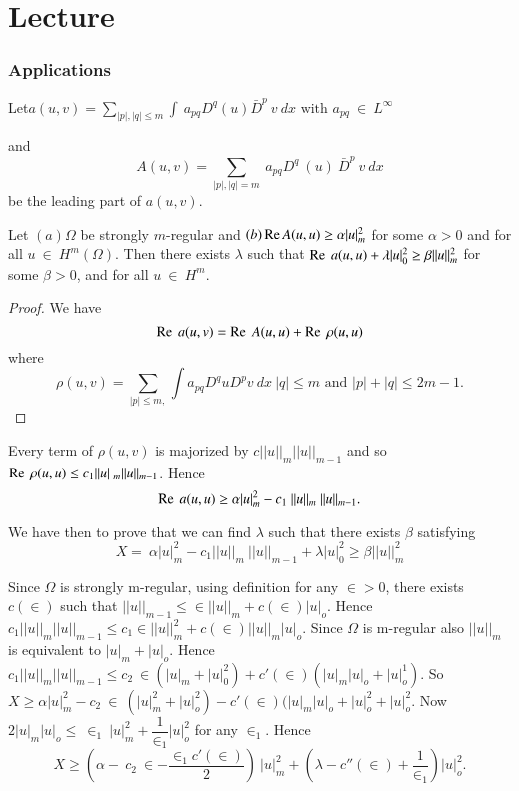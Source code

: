 
\chapter{Lecture}\label{lec13}%
\setcounter{section}{7}

\subsection{Applications}\label{lec13:sec7:subsec4}

Let\pageoriginale $ a(u,v) = \sum_{|p|,|q| \le m} \int~ a_{pq} D^q (u)\bar{D}^p ~ v
~ dx \text{ with }  a_{pq} ~ \in ~ L^\infty$ 

and 
$$
A(u,v) = \sum_{|p|,|q| = m } ~ a_{pq} D^{q} ~ (u) ~ \bar{D}^p ~ v ~ dx
$$
be the leading part of $a(u,v)$.

\setcounter{theorem}{7}
\begin{theorem}\label{lec13:sec7:subsec4:thm7.8}%
  Let $(a) \Omega$ be strongly $m$-regular and $(b) \operatorname{Re}  A(u,u) \ge
  \alpha | u |^2_m$ for some $\alpha > 0$ and for all $u ~ \in
  ~ H^m(\Omega)$. Then there exists $\lambda$ such that $\operatorname{Re}  ~ a(u,u) +
  \lambda | u |^2_0 \ge \beta || u ||^2_m$ for some $\beta > 0$, and for
  all $u ~ \in ~ H^m$. 
\end{theorem}

\begin{proof}%
  We have 
  $$
  \operatorname{Re}  ~ a(u,v) = \operatorname{Re}  ~ A(u,u) + \operatorname{Re}  ~ \rho (u,u)
  $$ 
  where 
  $$
  \rho (u,v) = \sum_{|p|\le m,} \int a_{pq} D^q u D^p v ~ dx ~ |q| \le m
  \text{ and } |p| + |q| \le 2m - 1. 
  $$
\end{proof}

Every term of $\rho (u,v)$ is majorized by $c || u ||_m || u ||_{m-1}$
and so $\operatorname{Re}  ~ \rho (u,u) \le c_1 || u |~_m || u ||_{m-1}$. Hence 
$$
\operatorname{Re}  ~ a(u,u) \ge \alpha | u |^2_m - c_1 ~ || u ||_m ~ ||u ||_{m-1}.
$$

We have then to prove that we can find $\lambda$ such that there
exists $\beta$ satisfying  
\begin{equation}
X = ~ \alpha | u |^2_m - c_1 || u ||_m ~ || u ||_{m-1} + \lambda | u
|^2_0 \ge \beta || u ||^2_m \tag{1}\label{lec13:sec7:subsec4:eq1} 
\end{equation}

Since $\Omega$ is strongly m-regular, using definition for any
$\in > 0$, there exists $c(\in)$ such that $|| u
||_{m-1}  \le \in || u ||_m + c(\in) | u |_o$. Hence\pageoriginale
$c_1 || u ||_m ||u ||_{m-1} \le c_1 \in || u ||^2_m +
c(\in) || u ||_m | u |_o$. Since $\Omega$ is m-regular also
$|| u ||_m$ is equivalent to $| u |_m + | u |_o$. Hence $c_1 || u ||_m
|| u ||_{m-1} \le c_2 ~ \in (| u |_m + | u |^2_0) +
c'(\in)(|u|_m|u|_o + |u |^1_o)$. So $X \ge \alpha | u |^2_m -
c_2 ~ \in ~ (|u|^2_m + | u |^2_o) - c'(\in) (|u|_m
|u|_o + |u|^2_o + |u|^2_o$. Now $2| u |_m| u |_o \le ~ \in_1 ~
| u |^2_m + \dfrac{1}{\in_1} | u |^2_o$ for any
$\in_1$. Hence 
$$
X \ge \left(\alpha - ~c_2 ~ \in - \dfrac{\in_1
  c'(\in)}{2}\right) ~  | u |^2_m + (\lambda - c'' (\in) +
\frac{1}{\in_1}) | u |^2_o. 
$$

